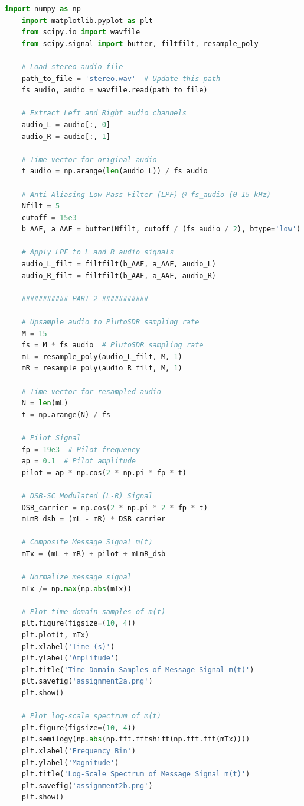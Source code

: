 \documentclass[
	letterpaper, %
	10pt, %
]{CSUniSchoolLabReport}
\begin{document}
\begin{lstlisting}[language=Python]
	import numpy as np
	import matplotlib.pyplot as plt
	from scipy.io import wavfile
	from scipy.signal import butter, filtfilt, resample_poly
	
	# Load stereo audio file
	path_to_file = 'stereo.wav'  # Update this path
	fs_audio, audio = wavfile.read(path_to_file)
	
	# Extract Left and Right audio channels
	audio_L = audio[:, 0]
	audio_R = audio[:, 1]
	
	# Time vector for original audio
	t_audio = np.arange(len(audio_L)) / fs_audio
	
	# Anti-Aliasing Low-Pass Filter (LPF) @ fs_audio (0-15 kHz)
	Nfilt = 5
	cutoff = 15e3
	b_AAF, a_AAF = butter(Nfilt, cutoff / (fs_audio / 2), btype='low')
	
	# Apply LPF to L and R audio signals
	audio_L_filt = filtfilt(b_AAF, a_AAF, audio_L)
	audio_R_filt = filtfilt(b_AAF, a_AAF, audio_R)
	
	########### PART 2 ###########
	
	# Upsample audio to PlutoSDR sampling rate
	M = 15
	fs = M * fs_audio  # PlutoSDR sampling rate
	mL = resample_poly(audio_L_filt, M, 1)
	mR = resample_poly(audio_R_filt, M, 1)
	
	# Time vector for resampled audio
	N = len(mL)
	t = np.arange(N) / fs
	
	# Pilot Signal
	fp = 19e3  # Pilot frequency
	ap = 0.1  # Pilot amplitude
	pilot = ap * np.cos(2 * np.pi * fp * t)
	
	# DSB-SC Modulated (L-R) Signal
	DSB_carrier = np.cos(2 * np.pi * 2 * fp * t)
	mLmR_dsb = (mL - mR) * DSB_carrier
	
	# Composite Message Signal m(t)
	mTx = (mL + mR) + pilot + mLmR_dsb
	
	# Normalize message signal
	mTx /= np.max(np.abs(mTx))
	
	# Plot time-domain samples of m(t)
	plt.figure(figsize=(10, 4))
	plt.plot(t, mTx)
	plt.xlabel('Time (s)')
	plt.ylabel('Amplitude')
	plt.title('Time-Domain Samples of Message Signal m(t)')
	plt.savefig('assignment2a.png')
	plt.show()
	
	# Plot log-scale spectrum of m(t)
	plt.figure(figsize=(10, 4))
	plt.semilogy(np.abs(np.fft.fftshift(np.fft.fft(mTx))))
	plt.xlabel('Frequency Bin')
	plt.ylabel('Magnitude')
	plt.title('Log-Scale Spectrum of Message Signal m(t)')
	plt.savefig('assignment2b.png')
	plt.show()

\end{lstlisting}
\end{document}
